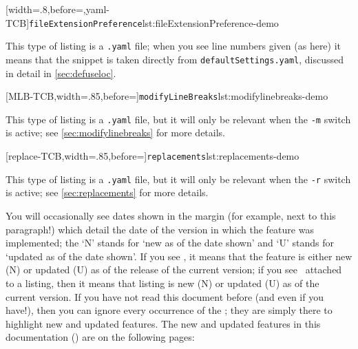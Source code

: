  \begin{minipage}{.4\textwidth}
  [width=.8\linewidth,before=\centering,yaml-TCB]{\texttt{fileExtensionPreference}}{lst:fileExtensionPreference-demo}
 \end{minipage}%
 \hfill
 \begin{minipage}{.4\textwidth}
  This type of listing is a \texttt{.yaml} file; when you see line numbers given (as here)
  it means that the snippet is taken directly from \texttt{defaultSettings.yaml}, discussed in
  detail in \vref{sec:defuseloc}.
 \end{minipage}%

 \begin{minipage}{.55\textwidth}
  [MLB-TCB,width=.85\linewidth,before=\centering]{\texttt{modifyLineBreaks}}{lst:modifylinebreaks-demo}
 \end{minipage}%
 \hfill
 \begin{minipage}{.4\textwidth}
  This type of listing is a \texttt{.yaml} file, but it will only
  be relevant when the \texttt{-m} switch is active; see \vref{sec:modifylinebreaks}
  for more details.
 \end{minipage}%

 \begin{minipage}{.55\textwidth}
  [replace-TCB,width=.85\linewidth,before=\centering]{\texttt{replacements}}{lst:replacements-demo}
 \end{minipage}%
 \hfill
 \begin{minipage}{.4\textwidth}
  This type of listing is a \texttt{.yaml} file, but it will only
  be relevant when the \texttt{-r} switch is active; see \vref{sec:replacements}
  for more details.
 \end{minipage}%

 You will occasionally see dates shown in the margin (for example, next to this
 paragraph!)  which detail the date of the version in which
 the feature was implemented; the `N' stands for `new as of the date shown' and `U' stands
 for `updated as of the date shown'. If you see \stardemo, it means that the feature is
 either new (N) or updated (U) as of the release of the current version; if you see
 \stardemo\, attached to a listing, then it means that listing is new (N) or updated (U)
 as of the current version. If you have not read this document before (and even if you
 have!), then you can ignore every occurrence of the \stardemo; they are simply there to
 highlight new and updated features. The new and updated features in this documentation
 (\gitRel) are on the following pages: \listOfNewFeatures%

